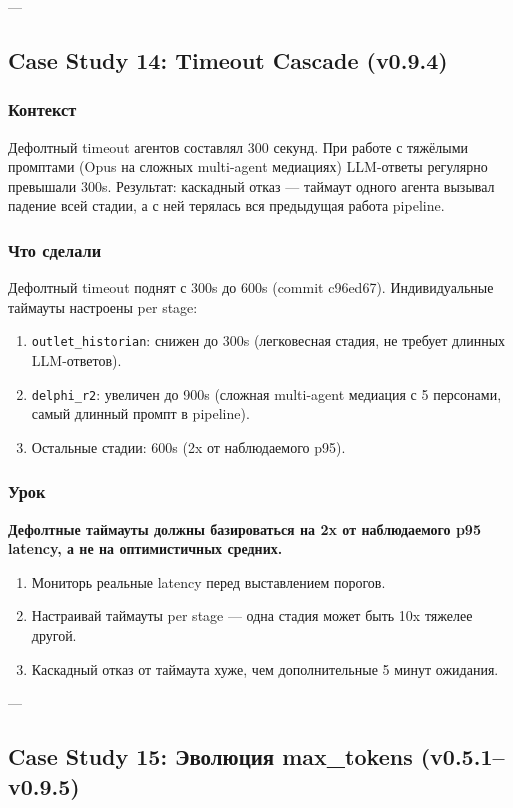 ---

\subsection{Case Study 14: Timeout Cascade (v0.9.4)}

\subsubsection*{Контекст}
Дефолтный timeout агентов составлял 300 секунд. При работе с тяжёлыми промптами (Opus на сложных multi-agent медиациях) LLM-ответы регулярно превышали 300s. Результат: каскадный отказ --- таймаут одного агента вызывал падение всей стадии, а с ней терялась вся предыдущая работа pipeline.

\subsubsection*{Что сделали}
Дефолтный timeout поднят с 300s до 600s (commit c96ed67). Индивидуальные таймауты настроены per stage:

\begin{enumerate}
\item \texttt{outlet\_historian}: снижен до 300s (легковесная стадия, не требует длинных LLM-ответов).
\item \texttt{delphi\_r2}: увеличен до 900s (сложная multi-agent медиация с 5 персонами, самый длинный промпт в pipeline).
\item Остальные стадии: 600s (2x от наблюдаемого p95).
\end{enumerate}

\subsubsection*{Урок}
\textbf{Дефолтные таймауты должны базироваться на 2x от наблюдаемого p95 latency, а не на оптимистичных средних.}

\begin{enumerate}
\item Мониторь реальные latency перед выставлением порогов.
\item Настраивай таймауты per stage --- одна стадия может быть 10x тяжелее другой.
\item Каскадный отказ от таймаута хуже, чем дополнительные 5 минут ожидания.
\end{enumerate}

---

\subsection{Case Study 15: Эволюция max\_tokens (v0.5.1--v0.9.5)}

